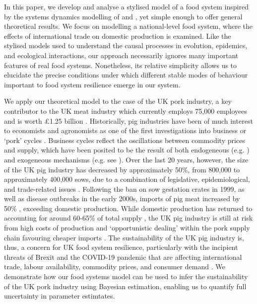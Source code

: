 \documentclass[12pt]{article}
\begin{document}
In this paper, we develop and analyse a stylised model of a food system inspired by the systems dynamics modelling of \cite{meadows1971} and \cite{sterman2000}, yet simple enough to offer general theoretical results. We focus on modelling a national-level food system, where the effects of international trade on domestic production is examined. Like the stylised models used to understand the causal processes in evolution, epidemics, and ecological interactions, our approach necessarily ignores many important features of real food systems. Nonetheless, its relative simplicity allows us to elucidate the precise conditions under which different stable modes of behaviour important to food system resilience emerge in our system.

We apply our theoretical model to the case of the UK pork industry, a key contributor to the UK meat industry which currently employs 75,000 employees and is worth \pounds1.25 billion \cite{DEFRA2019auk18}. Historically, pig industries have been of much interest to economists and agronomists as one of the first investigations into business or `pork' cycles \cite{haldane1934,coase1935,ezekiel1938,harlow1960,meadows1971,zawadzka2010,parker2014,sterman2000}. Business cycles reflect the oscillations between commodity prices and supply, which have been posited to be the result of both endogeneous (e.g. \cite{nerlove1958}) and exogeneous mechanisms (e.g. see \cite{gouel2012}). Over the last 20 years, however, the size of the UK pig industry has decreased by approximately 50\%, from 800,000 to approximately 400,000 sows, due to a combination of legislative, epidemiological, and trade-related issues \cite{taylor2006,dawson2009}. Following the ban on sow gestation crates in 1999, as well as disease outbreaks in the early 2000s, imports of pig meat increased by 50\% \cite{DEFRApigcattlestats2020}, exceeding domestic production. While domestic production has returned to accounting for around 60-65\% of total supply \cite{DEFRApigcattlestats2020}, the UK pig industry is still at risk from high costs of production \cite{BPEXprofitability2011} and `opportunistic dealing' within the pork supply chain favouring cheaper imports \cite{bowman2013}. The sustainability of the UK pig industry is, thus, a concern for UK food system resilience, particularly with the incipient threats of Brexit and the COVID-19 pandemic that are affecting international trade, labour availability, commodity prices, and consumer demand \cite{power2020,feng2017,poppy2019}. We demonstrate how our food systems model can be used to infer the sustainability of the UK pork industry using Bayesian estimation, enabling us to quantify full uncertainty in parameter estimtates.
\end{document}
